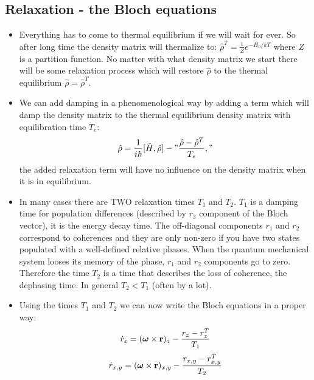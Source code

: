 \documentclass[AtomicOptical1Notes.tex]{subfiles}
\begin{document}
	\subsection{Relaxation - the Bloch equations}
		\begin{itemize}
			\item Everything has to come to thermal equilibrium if we will wait for ever. So after long time the density matrix will thermalize to: $ \hat{\rho}^T=\frac{1}{Z}e^{-H_0/kT} $ where $Z$ is a partition function. No matter with what density matrix we start there will be some relaxation process which will restore $\hat{\rho}$ to the thermal equilibrium $\hat{\rho}=\hat{\rho}^T$.
			\item We can add damping in a phenomenological way by adding a term which will damp the density matrix to the thermal equilibrium density matrix with equilibration time $T_e$: $$ \hat{\rho}=\frac{1}{i\hbar}[\hat{H},\hat{\rho}] - " \frac{\hat{\rho}-\hat{\rho}^T}{T_e}, "$$ the added relaxation term will have no influence on the density matrix when it is in equilibrium.
			\item In many cases there are TWO relaxation times $T_1$ and $T_2$. $T_1$ is a damping time for population differences (described by $r_3$ component of the Bloch vector), it is the energy decay time. The off-diagonal components $r_1$ and $r_2$ correspond to coherences and they are only non-zero if you have two states populated with a well-defined relative phases. When the quantum mechanical system looses its memory of the phase, $r_1$ and $r_2$ components go to zero. Therefore the time $T_2$ is a time that describes the loss of coherence, the dephasing time. In general $T_2 < T_1$ (often by a lot).
			\item Using the times $T_1$ and $T_2$ we can now write the Bloch equations in a proper way: $$ \dot{r}_z = (\mbox{\boldmath$ \omega $}\times\mathbf{r})_z - \frac{r_z-r_z^T}{T_1} $$  $$ \dot{r}_{x,y} = (\mbox{\boldmath$ \omega $}\times\mathbf{r})_{x,y} - \frac{r_{x,y}-r_{x,y}^T}{T_2} $$

\end{itemize}
\end{document}
